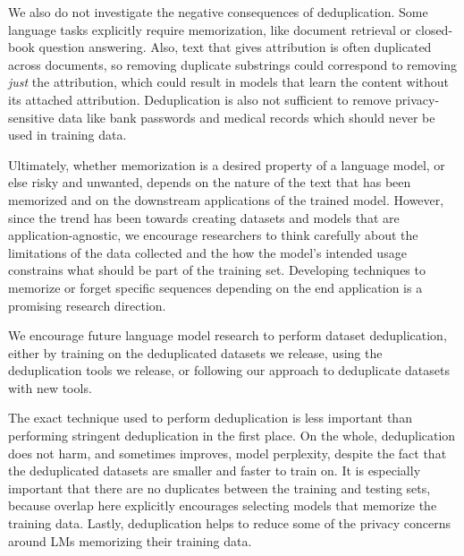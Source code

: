 We also do not investigate the negative consequences of deduplication.
Some language tasks explicitly require memorization, like document retrieval or closed-book question answering. 
Also, text that gives attribution is often duplicated across documents, so
removing duplicate substrings could correspond to removing \emph{just} the attribution, which could result in models that learn the content without its attached attribution.
Deduplication is also not sufficient to remove privacy-sensitive data like bank passwords and medical records which should never be used in training data.

Ultimately, whether memorization is a desired property of a language model, or else risky and unwanted, depends
on the nature of the text that has been memorized and on the downstream applications of the trained model.
However, since the trend has been towards creating datasets and models that are application-agnostic, we encourage researchers to think carefully about the limitations of the data
collected and the how the model's intended usage constrains what should be part of the training set. 
Developing techniques to memorize or forget specific sequences depending on the end application is a promising research direction. 

We encourage future language model research to perform dataset deduplication, either by training on the deduplicated datasets we release, using the deduplication tools we release, or following our approach to deduplicate datasets with new tools.

The exact technique used to perform deduplication is less important than performing stringent deduplication in the first place.
On the whole, deduplication does not harm, and sometimes improves, model perplexity, despite the fact that the deduplicated datasets are smaller and faster to train on.
It is especially important that there are no duplicates between the training and testing sets, because overlap here explicitly encourages selecting models that memorize the training data.
Lastly, deduplication helps to reduce some of the privacy concerns around LMs memorizing their training data.
